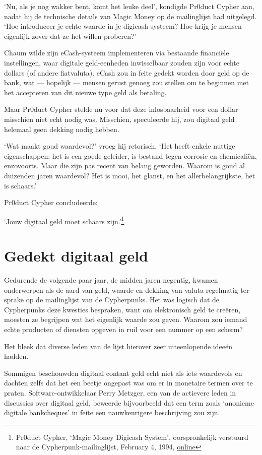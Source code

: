 \documentclass[smalldemyvopaper,11pt,twoside,onecolumn,openright,extrafontsizes,hidelinks]{memoir}
\begin{document}
`Nu, als je nog wakker bent, komt het leuke deel', kondigde Pr0duct
Cypher aan, nadat hij de technische details van Magic Money op de
mailinglijst had uitgelegd. `Hoe introduceer je echte waarde in je
digicash systeem? Hoe krijg je mensen eigenlijk zover dat ze het willen
proberen?'

Chaum wilde zijn eCash-systeem implementeren via bestaande financiële
instellingen, waar digitale geld-eenheden inwisselbaar zouden zijn voor
echte dollars (of andere fiatvaluta). eCash zou in feite gedekt worden
door geld op de bank, wat --- hopelijk --- mensen gerust genoeg zou
stellen om te beginnen met het accepteren van dit nieuwe type geld als
betaling.

Maar Pr0duct Cypher stelde nu voor dat deze inlosbaarheid voor een
dollar misschien niet echt nodig was. Misschien, speculeerde hij, zou
digitaal geld helemaal geen dekking nodig hebben.

`Wat maakt goud waardevol?' vroeg hij retorisch. `Het heeft enkele
nuttige eigenschappen: het is een goede geleider, is bestand tegen
corrosie en chemicaliën, enzovoorts. Maar die zijn pas recent van belang
geworden. Waarom is goud al duizenden jaren waardevol? Het is mooi, het
glanst, en het allerbelangrijkste, het is schaars.'

Pr0duct Cypher concludeerde:

`Jouw digitaal geld moet schaars zijn.'\footnote{Pr0duct Cypher, `Magic
  Money Digicash System', oorspronkelijk verstuurd naar de
  Cypherpunk-mailinglijst, February 4, 1994,
  \href{https://cypherpunks.venona.com/date/1994/02/msg00247.html}{online}}

\section{Gedekt digitaal geld}\label{gedekt-digitaal-geld}

Gedurende de volgende paar jaar, de midden jaren negentig, kwamen
onderwerpen als de aard van geld, waarde en dekking van valuta
regelmatig ter sprake op de mailinglijst van de Cypherpunks. Het was
logisch dat de Cypherpunks deze kwesties bespraken, want om elektronisch
geld te creëren, moesten ze begrijpen wat het eigenlijk waarde zou
geven. Waarom zou iemand echte producten of diensten opgeven in ruil
voor een nummer op een scherm?

Het bleek dat diverse leden van de lijst hierover zeer uiteenlopende
ideeën hadden.

Sommigen beschouwden digitaal contant geld echt niet als iets waardevols
en dachten zelfs dat het een beetje ongepast was om er in monetaire
termen over te praten. Software-ontwikkelaar Perry Metzger, een van de
actievere leden in discussies over digitaal geld, beweerde bijvoorbeeld
dat een term zoals `anonieme digitale bankcheques' in feite een
nauwkeurigere beschrijving zou zijn.
\end{document}
